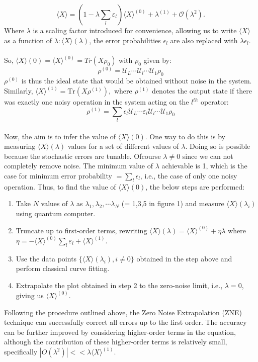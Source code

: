 \documentclass[12pt]{article}
\begin{document}
\begin{equation}
    \langle X \rangle = \left( 1 - \lambda \sum_l \varepsilon_l \right) \langle X \rangle^{(0)} + \lambda ^{(1)} + \mathcal{O}(\lambda^2).
\end{equation}
Where $\lambda$ is a scaling factor introduced for convenience, allowing us to write $\langle X \rangle$ as a function of $\lambda: \langle X \rangle (\lambda)$, the error probabilities $\epsilon_l$ are also replaced with $\lambda \epsilon_l$. \\ \\
So, $\langle X \rangle(0) = \langle X \rangle^{(0)} = Tr(X \rho_0)$ with $\rho_0$ given by:
\begin{equation}
    \rho^{(0)} = \mathcal{U}_L \cdots \mathcal{U}_l \cdots \mathcal{U}_1 \rho_0
\end{equation}
$\rho^{(0)}$ is thus the ideal state that would be obtained without noise in the system. Similarly, $\langle X \rangle^{(1)} = \text{Tr}(X \rho^{(1)}),
$ where $\rho^{(1)}$ denotes the output state if there was exactly one noisy operation in the system acting on the $l^{th}$ operator: 
\begin{equation}
    \rho^{(1)} = \sum_l \epsilon_l \mathcal{U}_L \cdots \varepsilon_l \mathcal{U}_l \cdots \mathcal{U}_1 \rho_0
\end{equation}\\
Now, the aim is to infer the value of $\langle X \rangle(0)$. One way to do this is by measuring $\langle X \rangle(\lambda)$ values for a set of different values of $\lambda$. Doing so is possible because the stochastic errors are tunable. Ofcourse $\lambda \neq 0$ since we can not completely remove noise. The minimum value of $\lambda$ achievable is 1, which is the case for minimum error probability $= \sum_l \epsilon_l$, i.e., the case of only one noisy operation. Thus, to find the value of $\langle X \rangle(0)$, the below steps are performed:
\begin{enumerate}
    \item Take $N$ values of $\lambda$ as $\lambda_1, \lambda_2, \cdots \lambda_N$ (= 1,3,5 in figure 1) and measure ${\langle X \rangle(\lambda_i)}$ using quantum computer. 
    \item Truncate up to first-order terms, rewriting $\langle X \rangle(\lambda) = \langle X \rangle^{(0)} + \eta\lambda$ where $\eta = -\langle X \rangle^{(0)} \sum_l \varepsilon_l + \langle X \rangle^{(1)}$. 
    \item Use the data points $\{\langle X \rangle (\lambda_i),  i \neq 0\}$ obtained in the step above and perform classical curve fitting.
    \item Extrapolate the plot obtained in step 2 to the zero-noise limit, i.e., $\lambda = 0$, giving us $\langle X \rangle^{(0)}$.
\end{enumerate}
Following the procedure outlined above, the Zero Noise Extrapolation (ZNE) technique can successfully correct all errors up to the first order. The accuracy can be further improved by considering higher-order terms in the equation, although the contribution of these higher-order terms is relatively small, specifically $|O(\lambda^2)| << \lambda \langle X \rangle^{(1)}$. 
\end{document}
